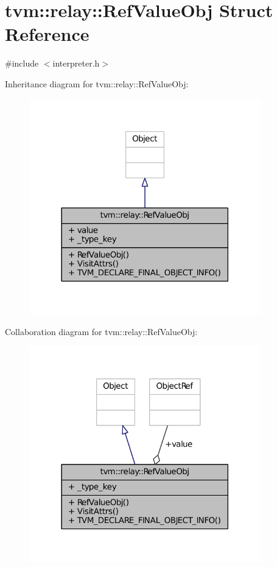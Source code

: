 \hypertarget{structtvm_1_1relay_1_1RefValueObj}{}\section{tvm\+:\+:relay\+:\+:Ref\+Value\+Obj Struct Reference}
\label{structtvm_1_1relay_1_1RefValueObj}


{\ttfamily \#include $<$interpreter.\+h$>$}



Inheritance diagram for tvm\+:\+:relay\+:\+:Ref\+Value\+Obj\+:
\nopagebreak
\begin{figure}[H]
\begin{center}
\leavevmode
\includegraphics[width=285pt]{structtvm_1_1relay_1_1RefValueObj__inherit__graph}
\end{center}
\end{figure}


Collaboration diagram for tvm\+:\+:relay\+:\+:Ref\+Value\+Obj\+:
\nopagebreak
\begin{figure}[H]
\begin{center}
\leavevmode
\includegraphics[width=285pt]{structtvm_1_1relay_1_1RefValueObj__coll__graph}
\end{center}
\end{figure}
